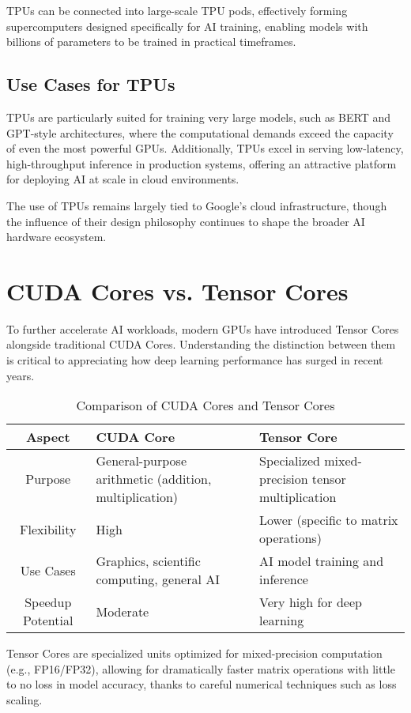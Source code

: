 \documentclass[openany]{book}
\begin{document}
TPUs can be connected into large-scale TPU pods, effectively forming 
supercomputers designed specifically for AI training, enabling models with 
billions of parameters to be trained in practical timeframes.

\subsection{Use Cases for TPUs}
TPUs are particularly suited for training very large models, such as BERT and 
GPT-style architectures, where the computational demands exceed the capacity of 
even the most powerful GPUs. Additionally, TPUs excel in serving low-latency, 
high-throughput inference in production systems, offering an attractive platform 
for deploying AI at scale in cloud environments.

The use of TPUs remains largely tied to Google's cloud infrastructure, though 
the influence of their design philosophy continues to shape the broader AI 
hardware ecosystem.

\section{CUDA Cores vs. Tensor Cores}

To further accelerate AI workloads, modern GPUs have introduced Tensor Cores 
alongside traditional CUDA Cores. Understanding the distinction between them is 
critical to appreciating how deep learning performance has surged in recent 
years.

\begin{table}[h]
\centering
\begin{tabular}{c|p{2.3in}p{2.5in}}
\hline
\textbf{Aspect} & \textbf{CUDA Core} & \textbf{Tensor Core} \\ \hline
Purpose & General-purpose arithmetic (addition, multiplication) & Specialized 
mixed-precision tensor multiplication \\ \hline
Flexibility & High & Lower (specific to matrix operations) \\ \hline
Use Cases & Graphics, scientific computing, general AI & AI model training and 
inference \\ \hline
Speedup Potential & Moderate & Very high for deep learning \\ \hline
\end{tabular}
\caption{Comparison of CUDA Cores and Tensor Cores}
\end{table}

Tensor Cores are specialized units optimized for mixed-precision computation 
(e.g., FP16/FP32), allowing for dramatically faster matrix operations with 
little to no loss in model accuracy, thanks to careful numerical techniques such 
as loss scaling.
\end{document}
